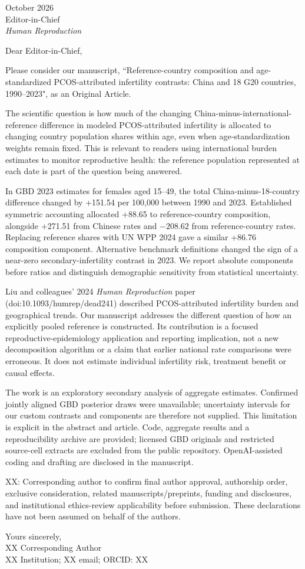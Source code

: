 \documentclass[11pt,a4paper]{article}
\begin{document}
 October 2026\\
Editor-in-Chief\\
\emph{Human Reproduction}

Dear Editor-in-Chief,

Please consider our manuscript, ``Reference-country composition and age-standardized PCOS-attributed infertility contrasts: China and 18 G20 countries, 1990--2023", as an Original Article.

The scientific question is how much of the changing China-minus-international-reference difference in modeled PCOS-attributed infertility is allocated to changing country population shares within age, even when age-standardization weights remain fixed. This is relevant to readers using international burden estimates to monitor reproductive health: the reference population represented at each date is part of the question being answered.

In GBD 2023 estimates for females aged 15--49, the total China-minus-18-country difference changed by +151.54 per 100,000 between 1990 and 2023. Established symmetric accounting allocated +88.65 to reference-country composition, alongside +271.51 from Chinese rates and $-208.62$ from reference-country rates. Replacing reference shares with UN WPP 2024 gave a similar +86.76 composition component. Alternative benchmark definitions changed the sign of a near-zero secondary-infertility contrast in 2023. We report absolute components before ratios and distinguish demographic sensitivity from statistical uncertainty.

Liu and colleagues' 2024 \emph{Human Reproduction} paper (doi:10.1093/humrep/dead241) described PCOS-attributed infertility burden and geographical trends. Our manuscript addresses the different question of how an explicitly pooled reference is constructed. Its contribution is a focused reproductive-epidemiology application and reporting implication, not a new decomposition algorithm or a claim that earlier national rate comparisons were erroneous. It does not estimate individual infertility risk, treatment benefit or causal effects.

The work is an exploratory secondary analysis of aggregate estimates. Confirmed jointly aligned GBD posterior draws were unavailable; uncertainty intervals for our custom contrasts and components are therefore not supplied. This limitation is explicit in the abstract and article. Code, aggregate results and a reproducibility archive are provided; licensed GBD originals and restricted source-cell extracts are excluded from the public repository. OpenAI-assisted coding and drafting are disclosed in the manuscript.

XX: Corresponding author to confirm final author approval, authorship order, exclusive consideration, related manuscripts/preprints, funding and disclosures, and institutional ethics-review applicability before submission. These declarations have not been assumed on behalf of the authors.

Yours sincerely,\\
XX Corresponding Author\\
XX Institution; XX email; ORCID: XX
\end{document}
